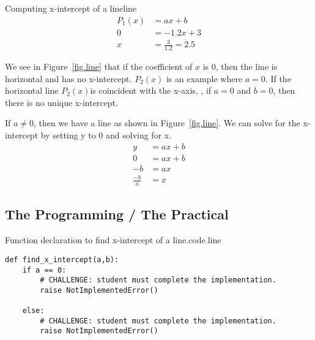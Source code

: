 \begin{example}{Computing x-intercept of a line}{line}
  \begin{align*}
  P_1(x) &= a x + b \\
  0  &= -1.2 x + 3\\
  x &= \frac{3}{1.2} = 2.5
  \end{align*}
\end{example}

We see in Figure~\ref{fig.line} that if the coefficient of $x$ is 0,
then the line is horizontal and has no x-intercept. $P_2(x)$ is an
example where $a=0$.  If the horizontal line $P_2(x)$is coincident
with the x-axis, \ie, if $a=0$ and $b=0$, then there is no unique
x-intercept.





If $a\neq 0$, then we have a line as shown in Figure~\ref{fig.line}.
We can solve for the x-intercept by setting y to 0 and solving for x.
\begin{align*}
  y &= a x + b\\
  0 &= a x + b\\
  -b &= a x\\
  \frac{-b}{a} &= x
\end{align*}



\subsection{The Programming / The Practical}


\begin{listing}{Function declaration to find x-intercept of a line.}{code.line}
\begin{minipage}[c]{0.95\textwidth}\begin{lstlisting}
def find_x_intercept(a,b):
    if a == 0:
        # CHALLENGE: student must complete the implementation.
        raise NotImplementedError()

    else:
        # CHALLENGE: student must complete the implementation.
        raise NotImplementedError()
\end{lstlisting}\end{minipage}\end{listing}


